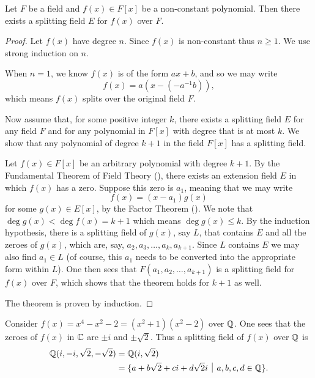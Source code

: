 \begin{theorem}
    Let $F$ be a field and $f(x) \in F[x]$ be a non-constant polynomial. Then there exists a splitting field $E$ for $f(x)$ over $F$.
\end{theorem}
\begin{proof}
    Let $f(x)$ have degree $n$. Since $f(x)$ is non-constant thus $n \geq 1$. We use strong induction on $n$.

    When $n = 1$, we know $f(x)$ is of the form $ax + b$, and so we may write
    \[
        f(x) = a\left(x - \left(-a^{-1}b\right)\right),
    \]
    which means $f(x)$ splits over the original field $F$.

    Now assume that, for some positive integer $k$, there exists a splitting field $E$ for any field $F$ and for any polynomial in $F[x]$ with degree that is at most $k$. We show that any polynomial of degree $k + 1$ in the field $F[x]$ has a splitting field.

    Let $f(x) \in F[x]$ be an arbitrary polynomial with degree $k + 1$. By the Fundamental Theorem of Field Theory (), there exists an extension field $E$ in which $f(x)$ has a zero. Suppose this zero is $a_1$, meaning that we may write
    \[
        f(x) = (x - a_1)g(x)
    \]
    for some $g(x) \in E[x]$, by the Factor Theorem (). We note that $\deg g(x) < \deg f(x) = k + 1$ which means $\deg g(x) \leq k$. By the induction hypothesis, there is a splitting field of $g(x)$, say $L$, that contains $E$ and all the zeroes of $g(x)$, which are, say, $a_2, a_3, \dots, a_k, a_{k+1}$. Since $L$ contains $E$ we may also find $a_1 \in L$ (of course, this $a_1$ needs to be converted into the appropriate form within $L$). One then sees that $F(a_1, a_2, \dots, a_{k+1})$ is a splitting field for $f(x)$ over $F$, which shows that the theorem holds for $k + 1$ as well.

    The theorem is proven by induction.
\end{proof}

\begin{example}
    Consider $f(x) = x^4 - x^2 - 2 = (x^2+1)(x^2 - 2)$ over $\mathbb{Q}$. One sees that the zeroes of $f(x)$ in $\mathbb{C}$ are $\pm i$ and $\pm\sqrt2$. Thus a splitting field of $f(x)$ over $\mathbb{Q}$ is
    \begin{align*}
        \Q(i, -i, \sqrt2, -\sqrt2) &= \Q(i, \sqrt2)\\
        &= \{a + b\sqrt2 + ci + d\sqrt2i \vert a, b, c, d \in \Q\}.
    \end{align*}
\end{example}

